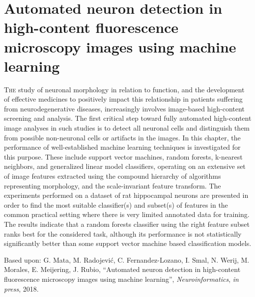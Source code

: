 %
%
\chpos{15mm}{8mm}
\chapter[Automated neuron detection in high-content fluorescence microscopy images using machine learning]{Automated neuron detection in high-content fluorescence microscopy images using machine learning}
\label{ch5:ndetchml}
{\small \lettrine{T}{he} study of neuronal morphology in relation to function, and the development of effective medicines to positively impact this relationship in patients suffering from neurodegenerative diseases, increasingly involves image-based high-content screening and analysis. The first critical step toward fully automated high-content image analyses in such studies is to detect all neuronal cells and distinguish them from possible non-neuronal cells or artifacts in the images. In this chapter, the performance of well-established machine learning techniques is investigated for this purpose. These include support vector machines, random forests, k-nearest neighbors, and generalized linear model classifiers, operating on an extensive set of image features extracted using the compound hierarchy of algorithms representing morphology, and the scale-invariant feature transform. The experiments performed on a dataset of rat hippocampal neurons are presented in order to find the most suitable classifier(s) and subset(s) of features in the common practical setting where there is very limited annotated data for training. The results indicate that a random forests classifier using the right feature subset ranks best for the considered task, although its performance is not statistically significantly better than some support vector machine based classification models.\par}
\vspace*{12em}
\begin{publish}
	Based upon: G. Mata, M. Radojevi\'{c}, C. Fernandez-Lozano, I. Smal, N. Werij, M. Morales, E. Meijering, J. Rubio, ``Automated neuron detection in high-content fluorescence microscopy images using machine learning'', \textit{Neuroinformatics}, \textit{in press}, 2018.%
\end{publish}

